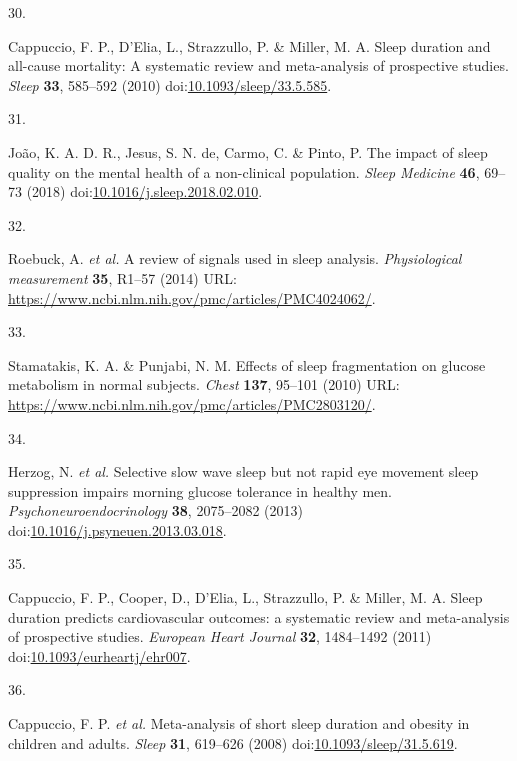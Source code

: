 \documentclass[
  10pt,
]{scrbook}
\newlength{\cslhangindent}
\newlength{\csllabelwidth}
\newlength{\cslentryspacingunit} %
\newenvironment{CSLReferences}[2] %
 {%
  \setlength{\parindent}{0pt}
  \ifodd #1
  \let\oldpar\par
  \def\par{\hangindent=\cslhangindent\oldpar}
  \fi
  \setlength{\parskip}{#2\cslentryspacingunit}
 }%
 {}
\newcommand{\CSLLeftMargin}[1]{\parbox[t]{\csllabelwidth}{#1}}
\newcommand{\CSLRightInline}[1]{\parbox[t]{\linewidth - \csllabelwidth}{#1}\break}
\begin{document}
\begin{CSLReferences}{0}{0}
\leavevmode{}%
\CSLLeftMargin{30. }%
\CSLRightInline{Cappuccio, F. P., D'Elia, L., Strazzullo, P. \& Miller,
M. A. Sleep duration and all-cause mortality: A systematic review and
meta-analysis of prospective studies. \emph{Sleep} \textbf{33}, 585--592
(2010)
doi:\href{https://doi.org/10.1093/sleep/33.5.585}{10.1093/sleep/33.5.585}.}

\leavevmode{}%
\CSLLeftMargin{31. }%
\CSLRightInline{João, K. A. D. R., Jesus, S. N. de, Carmo, C. \& Pinto,
P. The impact of sleep quality on the mental health of a non-clinical
population. \emph{Sleep Medicine} \textbf{46}, 69--73 (2018)
doi:\href{https://doi.org/10.1016/j.sleep.2018.02.010}{10.1016/j.sleep.2018.02.010}.}

\leavevmode{}%
\CSLLeftMargin{32. }%
\CSLRightInline{Roebuck, A. \emph{et al.} A review of signals used in
sleep analysis. \emph{Physiological measurement} \textbf{35}, R1--57
(2014) URL:
\url{https://www.ncbi.nlm.nih.gov/pmc/articles/PMC4024062/}.}

\leavevmode{}%
\CSLLeftMargin{33. }%
\CSLRightInline{Stamatakis, K. A. \& Punjabi, N. M. Effects of sleep
fragmentation on glucose metabolism in normal subjects. \emph{Chest}
\textbf{137}, 95--101 (2010) URL:
\url{https://www.ncbi.nlm.nih.gov/pmc/articles/PMC2803120/}.}

\leavevmode{}%
\CSLLeftMargin{34. }%
\CSLRightInline{Herzog, N. \emph{et al.} Selective slow wave sleep but
not rapid eye movement sleep suppression impairs morning glucose
tolerance in healthy men. \emph{Psychoneuroendocrinology} \textbf{38},
2075--2082 (2013)
doi:\href{https://doi.org/10.1016/j.psyneuen.2013.03.018}{10.1016/j.psyneuen.2013.03.018}.}

\leavevmode{}%
\CSLLeftMargin{35. }%
\CSLRightInline{Cappuccio, F. P., Cooper, D., D'Elia, L., Strazzullo, P.
\& Miller, M. A. Sleep duration predicts cardiovascular outcomes: a
systematic review and meta-analysis of prospective studies.
\emph{European Heart Journal} \textbf{32}, 1484--1492 (2011)
doi:\href{https://doi.org/10.1093/eurheartj/ehr007}{10.1093/eurheartj/ehr007}.}

\leavevmode{}%
\CSLLeftMargin{36. }%
\CSLRightInline{Cappuccio, F. P. \emph{et al.} Meta-analysis of short
sleep duration and obesity in children and adults. \emph{Sleep}
\textbf{31}, 619--626 (2008)
doi:\href{https://doi.org/10.1093/sleep/31.5.619}{10.1093/sleep/31.5.619}.}


\end{CSLReferences}
\end{document}
